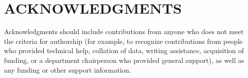 \documentclass[num-refs]{wiley-networks}
\begin{document}
\section*{\normalsize{ACKNOWLEDGMENTS}}
Acknowledgments should include contributions from anyone who does not meet the criteria for authorship (for example, to recognize contributions from people who provided technical help, collation of data, writing assistance, acquisition of funding, or a department chairperson who provided general support), as well as any funding or other support information.


%

\end{document}
